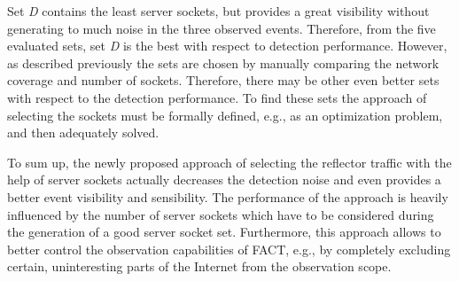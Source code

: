 Set \emph{D} contains the least \glspl{server socket}, but provides a great visibility without generating to much noise in the three observed events.
Therefore, from the five evaluated sets, set \emph{D} is the best with respect to detection performance. 
However, as described previously the sets are chosen by manually comparing the network coverage and number of sockets. Therefore, there may be other even better sets with respect to the detection performance. 
To find these sets the approach of selecting the sockets must be formally defined, e.g., as an optimization problem, and then adequately solved.

To sum up, the newly proposed approach of selecting the reflector traffic with the help of \glspl{server socket} actually decreases the detection noise and even provides a better event visibility and sensibility.
The performance of the approach is heavily influenced by the number of \glspl{server socket} which have to be considered during the generation of a good \gls{server socket} set.
Furthermore, this approach allows to better control the observation capabilities of \gls{FACT}, e.g., by completely excluding certain, uninteresting parts of the Internet from the observation scope.